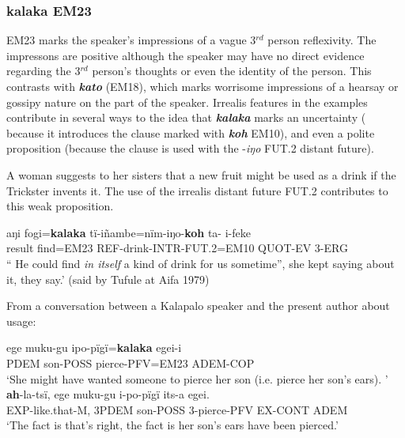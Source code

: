 \documentclass[output=paper]{langsci/langscibook}
\begin{document}
\subsubsection{kalaka EM23} 
EM23 marks the speaker’s impressions of a vague 3$^{rd}$ person reflexivity.  The impressons are positive although the speaker may have no direct evidence regarding the 3$^{rd}$ person’s thoughts or even the identity of the person.  This contrasts with \textbf{\textit{kato}} (EM18), which marks worrisome impressions of a hearsay or gossipy nature on the part of the speaker.  Irrealis features in the examples contribute in several ways to the idea that \textbf{\textit{kalaka}}  marks an uncertainty ( because it introduces the clause marked with \textbf{\textit{koh}} EM10),  and even a polite proposition (because the clause is used with the -\textit{iŋo} FUT.2 distant future). %

A woman suggests to her sisters that a new fruit might be used as a drink if the Trickster invents it. The use of the irrealis distant future FUT.2 contributes to this weak proposition. %

\begin{exe}
	\ex \label{ex:eb56}
	\gll aŋi fogi=\textbf{kalaka} tï-iñambe=nïm-iŋo-\textbf{koh} ta- i-feke\\
	result find=EM23 REF-drink-INTR-FUT.2=EM10 QUOT-EV 3-ERG\\
	\trans “ He could find \textit{in itself}  a kind of drink for us sometime”, she kept saying about it, they say.’ (said by Tufule at Aifa 1979)
\end{exe}

From a conversation between a Kalapalo speaker and the present author about usage:

\begin{exe}
\ex \label{ex:eb57}
	\begin{xlist}
	\ex 
	\gll ege muku-gu ipo-pïgï=\textbf{kalaka} egei-i\\
	PDEM son-POSS pierce-PFV=EM23 ADEM-COP\\
	\trans ‘She might have wanted someone to pierce her son (i.e. pierce her son’s ears). ’
	\ex 
	\gll \textbf{ah}-la-tsï, ege muku-gu i-po-pïgï its-a egei.\\
	EXP-like.that-M, 3PDEM son-POSS 3-pierce-PFV EX-CONT ADEM\\
	\trans ‘The fact is that’s right, the fact is her son’s ears have been pierced.’
\end{xlist}
\end{exe}
\end{document}
